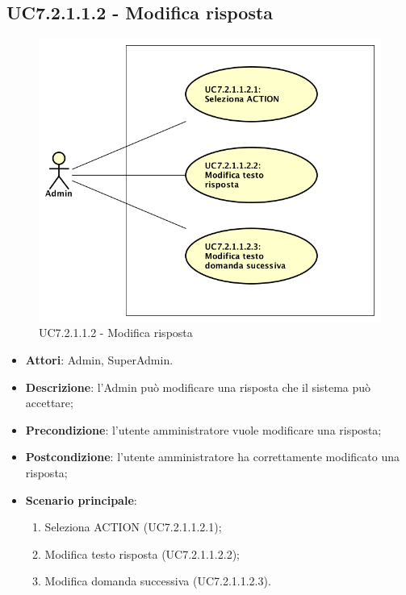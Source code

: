 \documentclass[../AnalisiDeiRequisiti_v3.0.0.tex]{subfiles}
\begin{document}
\begin{itemize}
\subsection{UC7.2.1.1.2 - Modifica risposta} 
\label{sssec:UC7.2.1.1.2} 
\begin{figure}[!h]
	\centering
	\includegraphics[scale=0.7]{UseCases/UC7_GestionePannelloAdmin/UC7_2_GestioneDomande/UC7_2_1_AggiungiDomanda/UC7_2_1_1_GestioneRisposte/UC7_2_1_1_2_ModificaRisposta/UC7_2_1_1_2_ModificaRisposta.png}
	\caption{UC7.2.1.1.2 - Modifica risposta}
\end{figure}
\begin{itemize} 
\item \textbf{Attori}: Admin, SuperAdmin.
\item \textbf{Descrizione}: l'Admin può modificare una risposta che il sistema può accettare;
\item \textbf{Precondizione}: l'utente amministratore vuole modificare una risposta;
\item \textbf{Postcondizione}: l'utente amministratore ha correttamente modificato una risposta;
\item \textbf{Scenario principale}: \begin{enumerate}\item Seleziona ACTION (UC7.2.1.1.2.1);\item Modifica testo risposta (UC7.2.1.1.2.2);\item Modifica domanda successiva (UC7.2.1.1.2.3).
\end{enumerate}
\end{itemize} 

\end{itemize}
\end{document}
